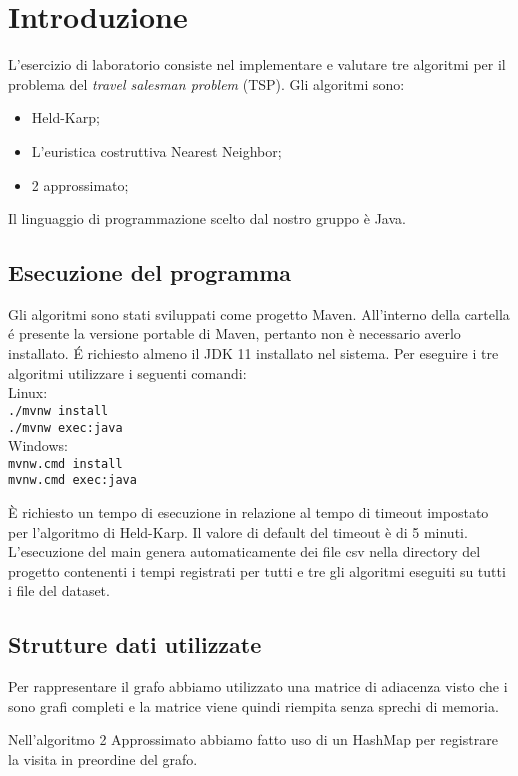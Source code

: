 \section{Introduzione}

L'esercizio di laboratorio consiste nel implementare e valutare tre algoritmi per il problema del \textit{travel salesman problem} (TSP). Gli algoritmi sono:
\begin{itemize}
	\item Held-Karp;
	\item L'euristica costruttiva Nearest Neighbor;
	\item 2 approssimato;
\end{itemize}
Il linguaggio di programmazione scelto dal nostro gruppo è Java.

\subsection{Esecuzione del programma}
Gli algoritmi sono stati sviluppati come progetto Maven. All'interno della cartella \'e presente la versione portable di Maven, pertanto non è necessario averlo installato. \'E
richiesto almeno il JDK 11 installato nel sistema.
Per eseguire i tre algoritmi utilizzare i seguenti comandi:\\
Linux:\\
\indent \texttt{./mvnw install}\\
\indent \texttt{./mvnw exec:java}\\
Windows:\\
\indent \texttt{mvnw.cmd install}\\
\indent \texttt{mvnw.cmd exec:java}

\uppercase{è} richiesto un tempo di esecuzione in relazione al tempo di timeout impostato per l'algoritmo di Held-Karp. Il valore di default del timeout è di 5 minuti.
L'esecuzione del main genera automaticamente dei file csv nella directory del progetto contenenti i tempi registrati per tutti e tre gli algoritmi eseguiti su tutti i file del dataset.
\subsection{Strutture dati utilizzate}

Per rappresentare il grafo abbiamo utilizzato una matrice di adiacenza visto che i sono grafi completi e la matrice viene quindi riempita senza sprechi di memoria.

Nell'algoritmo 2 Approssimato abbiamo fatto uso di un HashMap per registrare la visita in preordine del grafo.

